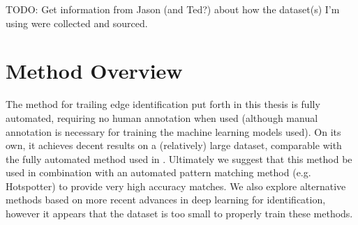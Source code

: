 TODO: Get information from Jason (and Ted?) about how the dataset(s) I'm using were collected and sourced.

\section{Method Overview}

The method for trailing edge identification put forth in this thesis is fully automated, requiring no human annotation when used (although manual annotation is necessary for training the machine learning models used).
On its own, it achieves decent results on a (relatively) large dataset, comparable with the fully automated method used in \cite{hughes2015automated}. 
Ultimately we suggest that this method be used in combination with an automated pattern matching method (e.g. Hotspotter) to provide very high accuracy matches.
We also explore alternative methods based on more recent advances in deep learning for identification, however it appears that the dataset is too small to properly train these methods.


